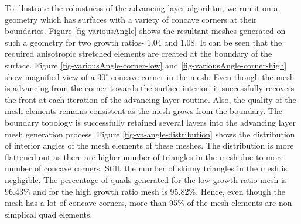 \documentclass[conf]{new-aiaa}
\begin{document}
To illustrate the robustness of the advancing layer algorihtm, we run it on a geometry which has surfaces with a variety of concave corners at their boundaries. Figure \ref{fig-variousAngle} shows the resultant meshes generated on such a geometry for two growth ratios- 1.04 and 1.08. It can be seen that the required anisotropic stretched elements are created at the boundary of the surface. Figure \ref{fig-variousAngle-corner-low} and \ref{fig-variousAngle-corner-high} show magnified view of a 30$^\circ$ concave corner in the mesh. Even though the mesh is advancing from the corner towards the surface interior, it successfully recovers the front at each iteration of the advancing layer routine. Also, the quality of the mesh elements remains consistent as the mesh grows from the boundary. The boundary topology is successfully retained several layers into the advancing layer mesh generation process. Figure \ref{fig-va-angle-distribution} shows the distribution of interior angles of the mesh elements of these meshes. The distribution is more flattened out as there are higher number of triangles in the mesh due to more number of concave corners. Still, the number of skinny triangles in the mesh is negligible. The percentage of quads generated for the low growth ratio mesh is 96.43\% and for the high growth ratio mesh is 95.82\%. Hence, even though the mesh has a lot of concave corners, more than 95\% of the mesh elements are non-simplical quad elements.
\end{document}
